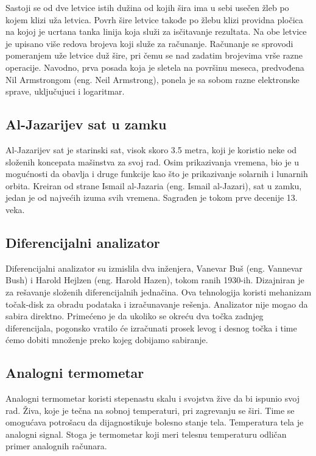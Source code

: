 \documentclass[a4paper]{article}
\begin{document}
Sastoji se od dve letvice istih dužina od kojih šira ima u sebi usečen žleb po kojem klizi uža letvica. Povrh šire letvice takođe po žlebu klizi providna pločica na kojoj je ucrtana tanka linija koja služi za isčitavanje rezultata. Na obe letvice je upisano više redova brojeva koji služe za računanje.
Računanje se sprovodi pomeranjem uže letvice duž šire, pri čemu se nad zadatim brojevima vrše razne operacije.
Navodno, prva posada koja je sletela na površinu meseca, predvođena Nil Armstrongom (eng. Neil Armstrong), ponela je sa sobom razne elektronske sprave, uključujuci i logaritmar.

\subsection{Al-Jazarijev sat u zamku}
\label{subsec:podnaslov2}

Al-Jazarijev sat je starinski sat, visok skoro 3.5 metra, koji je koristio neke od složenih koncepata mašinstva za svoj rad. Osim prikazivanja vremena, bio je u mogućnosti da obavlja i druge funkcije kao što je prikazivanje solarnih i lunarnih orbita. Kreiran od strane Ismail al-Jazaria (eng. Ismail al-Jazari), sat u zamku, jedan je od najvećih izuma svih vremena. Sagrađen je tokom prve decenije 13. veka. 

\subsection{Diferencijalni analizator}
\label{subsec:podnaslov3}

 Diferencijalni analizator su izmislila dva inženjera, Vanevar Buš (eng. Vannevar Bush) i Harold Hejlzen (eng. Harold Hazen), tokom ranih 1930-ih. Dizajniran je za rešavanje složenih diferencijalnih jednačina. Ova tehnologija koristi mehanizam točak-disk za obradu podataka i izračunavanje rešenja. Analizator nije mogao da sabira direktno. Primećeno je da ukoliko se okreću dva točka zadnjeg diferencijala, pogonsko vratilo će izračunati prosek levog i desnog točka i time ćemo dobiti množenje preko kojeg dobijamo sabiranje.

\subsection{Analogni termometar}
\label{subsec:podnaslov4}

Analogni termometar koristi stepenastu skalu i svojstva žive da bi ispunio svoj rad. Živa, koje je tečna na sobnoj temperaturi, pri zagrevanju se širi. Time se omogućava potrošacu da dijagnostikuje bolesno stanje tela. Temperatura tela je analogni signal. Stoga je termometar koji meri telesnu temperaturu odličan primer analognih računara. 
\end{document}
